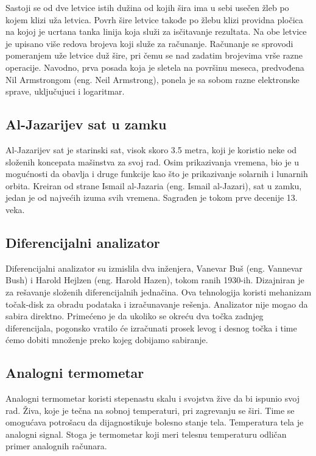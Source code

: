 \documentclass[a4paper]{article}
\begin{document}
Sastoji se od dve letvice istih dužina od kojih šira ima u sebi usečen žleb po kojem klizi uža letvica. Povrh šire letvice takođe po žlebu klizi providna pločica na kojoj je ucrtana tanka linija koja služi za isčitavanje rezultata. Na obe letvice je upisano više redova brojeva koji služe za računanje.
Računanje se sprovodi pomeranjem uže letvice duž šire, pri čemu se nad zadatim brojevima vrše razne operacije.
Navodno, prva posada koja je sletela na površinu meseca, predvođena Nil Armstrongom (eng. Neil Armstrong), ponela je sa sobom razne elektronske sprave, uključujuci i logaritmar.

\subsection{Al-Jazarijev sat u zamku}
\label{subsec:podnaslov2}

Al-Jazarijev sat je starinski sat, visok skoro 3.5 metra, koji je koristio neke od složenih koncepata mašinstva za svoj rad. Osim prikazivanja vremena, bio je u mogućnosti da obavlja i druge funkcije kao što je prikazivanje solarnih i lunarnih orbita. Kreiran od strane Ismail al-Jazaria (eng. Ismail al-Jazari), sat u zamku, jedan je od najvećih izuma svih vremena. Sagrađen je tokom prve decenije 13. veka. 

\subsection{Diferencijalni analizator}
\label{subsec:podnaslov3}

 Diferencijalni analizator su izmislila dva inženjera, Vanevar Buš (eng. Vannevar Bush) i Harold Hejlzen (eng. Harold Hazen), tokom ranih 1930-ih. Dizajniran je za rešavanje složenih diferencijalnih jednačina. Ova tehnologija koristi mehanizam točak-disk za obradu podataka i izračunavanje rešenja. Analizator nije mogao da sabira direktno. Primećeno je da ukoliko se okreću dva točka zadnjeg diferencijala, pogonsko vratilo će izračunati prosek levog i desnog točka i time ćemo dobiti množenje preko kojeg dobijamo sabiranje.

\subsection{Analogni termometar}
\label{subsec:podnaslov4}

Analogni termometar koristi stepenastu skalu i svojstva žive da bi ispunio svoj rad. Živa, koje je tečna na sobnoj temperaturi, pri zagrevanju se širi. Time se omogućava potrošacu da dijagnostikuje bolesno stanje tela. Temperatura tela je analogni signal. Stoga je termometar koji meri telesnu temperaturu odličan primer analognih računara. 
\end{document}
